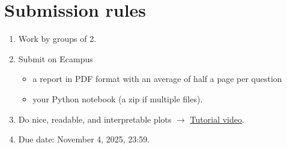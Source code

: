 \documentclass[a4paper]{article}
\begin{document}
\section{Submission rules} 
\begin{enumerate}
    \item Work by groups of 2.
    \item Submit on Ecampus
    \begin{itemize}
        \item a report in PDF format with an average of half a page per question
        \item your Python notebook (a zip if multiple files).
    \end{itemize} 
    \item Do nice, readable, and interpretable plots $\rightarrow$ \href{https://www.youtube.com/watch?v=rUV8VFbUi_U}{Tutorial video}.
    \item Due date: November 4, 2025, 23:59.
\end{enumerate}
\end{document}
